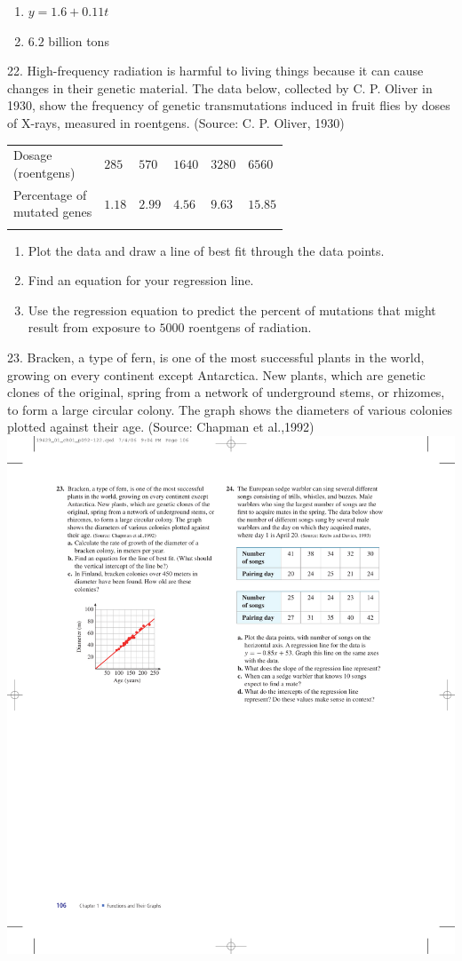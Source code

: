 \documentclass[10pt,]{book}
\makeatletter
\theoremstyle{plain}
\theoremstyle{definition}
\theoremstyle{definition}
\theoremstyle{definition}
\theoremstyle{definition}
\numberwithin{equation}{part}
\newcommand{\hrulethin}  {\noalign{\hrule height 0.04em}}
\newcommand{\tablecelllines}[3]%
{\begin{tabular}[#2]{@{}#1@{}}#3\end{tabular}}
\makeatother
\begin{document}
\begin{exerciselist}
\begin{multicols}{2}
\begin{enumerate}[label=*\alph**]
%
\item\hypertarget{li-1436}{}\(y = 1.6 + 0.11t\)%
\item\hypertarget{li-1437}{}\(6.2\) billion tons%
\end{enumerate}
\end{multicols}
%
\item[22.]\hypertarget{exercise-378}{}High-frequency radiation is harmful to living things because it can cause changes in their genetic material. The data below, collected by C. P. Oliver in 1930, show the frequency of genetic transmutations induced in fruit flies by doses of X-rays, measured in roentgens. (Source: C. P. Oliver, 1930) \leavevmode%
\begin{table}
\centering
\begin{tabular}{AlA}\hrulethin
\tablecelllines{l}{m}
{Dosage\\
(roentgens)}
&\(285\)&\(570\)&\(1640\)&\(3280\)&\(6560\)\tabularnewline\hrulethin
\tablecelllines{l}{m}
{Percentage of\\
mutated genes}
&\(1.18\)&\(2.99\)&\(4.56\)&\(9.63\)&\(15.85\)\tabularnewline\hrulethin
\end{tabular}
\end{table}
 \leavevmode%
\begin{enumerate}[label=*\alph**]
\item\hypertarget{li-1438}{}Plot the data and draw a line of best fit through the data points.%
\item\hypertarget{li-1439}{}Find an equation for your regression line.%
\item\hypertarget{li-1440}{}Use the regression equation to predict the percent of mutations that might result from exposure to \(5000\) roentgens of radiation.%
\end{enumerate}
%
\par\smallskip
\item[23.]\hypertarget{exercise-379}{}Bracken, a type of fern, is one of the most successful plants in the world, growing on every continent except Antarctica. New plants, which are genetic clones of the original, spring from a network of underground stems, or rhizomes, to form a large circular colony. The graph shows the diameters of various colonies plotted against their age. (Source: Chapman et al.,1992) \includegraphics[width=0.4\linewidth]{images/fig-ex-1-6-23}

\end{exerciselist}
\end{document}
